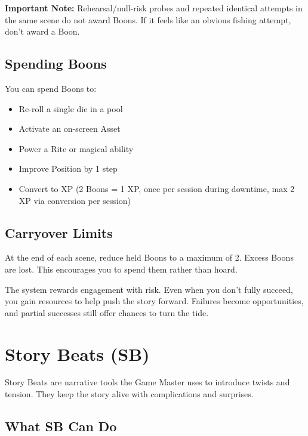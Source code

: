 \documentclass[11pt,twoside,openany]{book}
\begin{document}
\textbf{Important Note:} Rehearsal/null-risk probes and repeated identical attempts in the same scene do not award Boons. If it feels like an obvious fishing attempt, don't award a Boon.

\subsection*{Spending Boons}

You can spend Boons to:
\begin{itemize}
\item Re-roll a single die in a pool
\item Activate an on-screen Asset
\item Power a Rite or magical ability
\item Improve Position by 1 step
\item Convert to XP (2 Boons = 1 XP, once per session during downtime, max 2 XP via conversion per session)
\end{itemize}

\subsection*{Carryover Limits}

At the end of each scene, reduce held Boons to a maximum of 2. Excess Boons are lost. This encourages you to spend them rather than hoard.

\begin{tcolorbox}[colback=gray!5!white, colframe=gray!75!black, title=Why This Matters, fonttitle=\bfseries]
The system rewards engagement with risk. Even when you don't fully succeed, you gain resources to help push the story forward. Failures become opportunities, and partial successes still offer chances to turn the tide.
\end{tcolorbox}

\section*{Story Beats (SB)} 

Story Beats are narrative tools the Game Master uses to introduce twists and tension. They keep the story alive with complications and surprises.

\subsection*{What SB Can Do}
\end{document}
